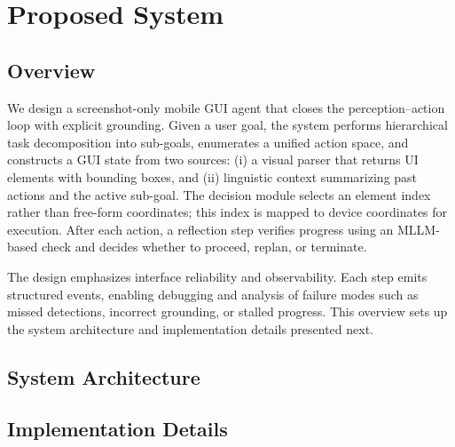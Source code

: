 \section{Proposed System}
\label{method}

\subsection{Overview}
We design a screenshot-only mobile GUI agent that closes the perception--action loop with explicit grounding. Given a user goal, the system performs hierarchical task decomposition into sub-goals, enumerates a unified action space, and constructs a GUI state from two sources: (i) a visual parser that returns UI elements with bounding boxes, and (ii) linguistic context summarizing past actions and the active sub-goal. The decision module selects an element index rather than free-form coordinates; this index is mapped to device coordinates for execution. After each action, a reflection step verifies progress using an MLLM-based check and decides whether to proceed, replan, or terminate.

The design emphasizes interface reliability and observability. Each step emits structured events, enabling debugging and analysis of failure modes such as missed detections, incorrect grounding, or stalled progress. This overview sets up the system architecture and implementation details presented next.
\subsection{System Architecture}
\subsection{Implementation Details}
